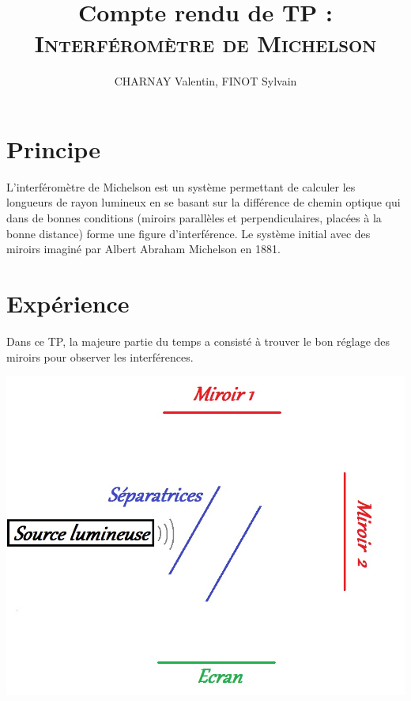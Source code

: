 \documentclass[12pt,a4paper]{article}
\author{CHARNAY Valentin, FINOT Sylvain}
\title{Compte rendu de TP : \\[4pt] \scshape Interféromètre de Michelson}
\begin{document}
	\maketitle
	
	\section{Principe}
	
	L'interféromètre de Michelson est un système permettant de calculer les longueurs de rayon lumineux en se basant sur la différence de chemin optique qui dans de bonnes conditions (miroirs parallèles et perpendiculaires, placées à la bonne distance) forme une figure d'interférence. Le système initial avec des miroirs imaginé par Albert Abraham Michelson en 1881.
	
	\section{Expérience}
	
	Dans ce TP, la majeure partie du temps a consisté à trouver le bon réglage des miroirs pour observer les interférences.
	
	\begin{center}
		\includegraphics[scale=0.4]{schem1}
	\end{center}
	
\end{document}
